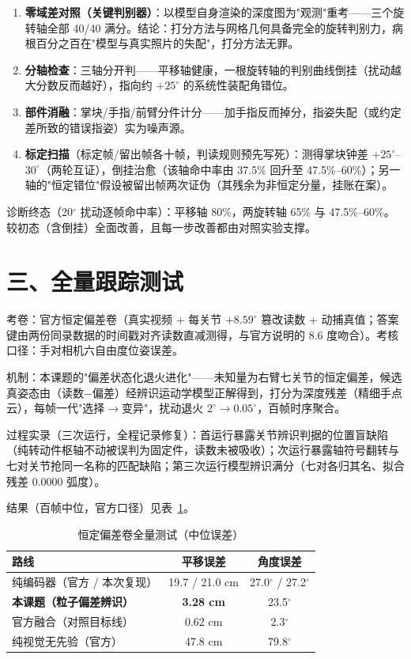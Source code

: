 \documentclass{article}
\begin{document}
\begin{enumerate}
\item \textbf{零域差对照（关键判别器）}：以模型自身渲染的深度图为"观测"重考——三个旋转轴全部 40/40 满分。结论：打分方法与网格几何具备完全的旋转判别力，病根百分之百在"模型与真实照片的失配"，打分方法无罪。
\item \textbf{分轴检查}：三轴分开判——平移轴健康，一根旋转轴的判别曲线倒挂（扰动越大分数反而越好），指向约 $+25^\circ$ 的系统性装配角错位。
\item \textbf{部件消融}：掌块/手指/前臂分件计分——加手指反而掉分，指姿失配（或约定差所致的错误指姿）实为噪声源。
\item \textbf{标定扫描}（标定帧/留出帧各十帧，判读规则预先写死）：测得掌块钟差 $+25^\circ$--$30^\circ$（两轮互证），倒挂治愈（该轴命中率由 37.5\% 回升至 47.5\%--60\%）；另一轴的"恒定错位"假设被留出帧两次证伪（其残余为非恒定分量，挂账在案）。
\end{enumerate}

诊断终态（20$^\circ$ 扰动逐帧命中率）：平移轴 80\%，两旋转轴 65\% 与 47.5\%--60\%。较初态（含倒挂）全面改善，且每一步改善都由对照实验支撑。

\section{三、全量跟踪测试}
考卷：官方恒定偏差卷（真实视频 + 每关节 $+8.59^\circ$ 篡改读数 + 动捕真值；答案键由两份同录数据的时间戳对齐读数直减测得，与官方说明的 8.6 度吻合）。考核口径：手对相机六自由度位姿误差。

机制：本课题的"偏差状态化退火进化"——未知量为右臂七关节的恒定偏差，候选真姿态由（读数$-$偏差）经辨识运动学模型正解得到，打分为深度残差（精细手点云），每帧一代"选择$\rightarrow$变异"，扰动退火 $2^\circ\!\to\!0.05^\circ$，百帧时序聚合。

过程实录（三次运行，全程记录修复）：首运行暴露关节辨识判据的位置盲缺陷（纯转动件枢轴不动被误判为固定件，读数未被吸收）；次运行暴露轴符号翻转与七对关节抢同一名称的匹配缺陷；第三次运行模型辨识满分（七对各归其名、拟合残差 0.0000 弧度）。

结果（百帧中位，官方口径）见表~\ref{tab:full}。

\begin{table}[h]\centering
\caption{恒定偏差卷全量测试（中位误差）}
\label{tab:full}
\begin{tabular}{lcc}
\toprule
路线 & 平移误差 & 角度误差 \\
\midrule
纯编码器（官方 / 本次复现） & 19.7 / 21.0 cm & 27.0$^\circ$ / 27.2$^\circ$ \\
\textbf{本课题（粒子偏差辨识）} & \textbf{3.28 cm} & 23.5$^\circ$ \\
官方融合（对照目标线） & 0.62 cm & 2.3$^\circ$ \\
纯视觉无先验（官方） & 47.8 cm & 79.8$^\circ$ \\
\bottomrule
\end{tabular}
\end{table}
\end{document}
